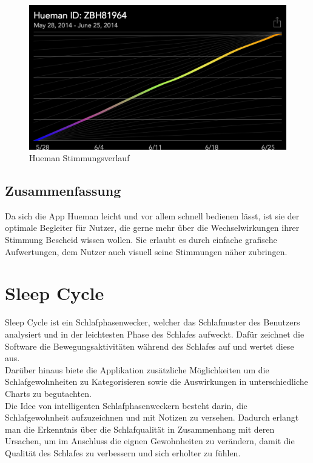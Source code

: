 \begin{figure}[H]
 \centering
 \includegraphics[scale=0.3]{images/hueman-matched-data.PNG}
 \caption{Hueman Stimmungsverlauf \cite{fig:Vergleich}}
 \label{fig:Vergleich}
\end{figure}


\subsection{Zusammenfassung}
\label{ch:Apps:sec:Hueman:subsec:Verdict}

Da sich die App Hueman leicht und vor allem schnell bedienen lässt, ist sie der optimale Begleiter für Nutzer, die gerne mehr über die Wechselwirkungen ihrer Stimmung Bescheid wissen wollen.
Sie erlaubt es durch einfache grafische Aufwertungen, dem Nutzer auch visuell seine Stimmungen näher zubringen.  


\section{Sleep Cycle}
\label{ch:Apps:sec:SleepCycle}

Sleep Cycle ist ein Schlafphasenwecker, welcher das Schlafmuster des Benutzers analysiert und in der leichtesten Phase des Schlafes aufweckt\cite{web:SleepCycle}. 
Dafür zeichnet die Software die Bewegungsaktivitäten während des Schlafes auf und wertet diese aus.\\
Darüber hinaus biete die Applikation zusätzliche Möglichkeiten um die Schlafgewohnheiten zu Kategorisieren sowie die Auswirkungen in unterschiedliche Charts zu begutachten. \\
Die Idee von intelligenten Schlafphasenweckern besteht darin, die Schlafgewohnheit aufzuzeichnen und mit Notizen zu versehen. Dadurch erlangt man die Erkenntnis über die Schlafqualität in Zusammenhang mit deren Ursachen, um im Anschluss die eignen Gewohnheiten zu verändern, damit die Qualität des Schlafes zu verbessern und sich erholter zu fühlen.

